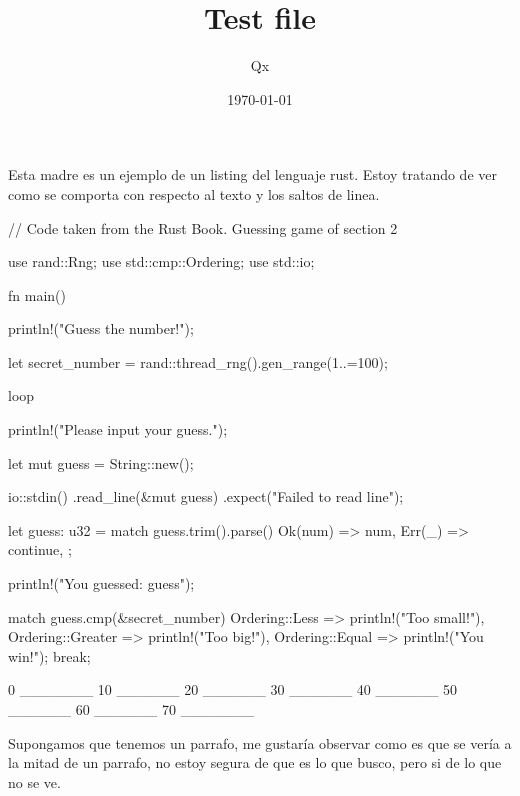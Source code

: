 \documentclass[pagecolor=true, pagesize=a5paper, stretchmode]{qx-files/qx-notes}
\title{Test file}
\author{Qx}
\date{\today}
\begin{document}
  \maketitle

  Esta madre es un ejemplo de un listing del lenguaje rust. Estoy tratando de ver
  como se comporta con respecto al texto y los saltos de linea.


  \begin{codeblock}
    // Code taken from the Rust Book. Guessing game of section 2

    use rand::Rng;
    use std::cmp::Ordering;
    use std::io;

    fn main() {
      println!("Guess the number!");

      let secret_number = rand::thread_rng().gen_range(1..=100);

      loop {
        println!("Please input your guess.");

        let mut guess = String::new();

        io::stdin()
            .read_line(&mut guess)
            .expect("Failed to read line");

        let guess: u32 = match guess.trim().parse() {
          Ok(num) => num,
          Err(_) => continue,
        };

        println!("You guessed: {guess}");

        match guess.cmp(&secret_number) {
          Ordering::Less => println!("Too small!"),
          Ordering::Greater => println!("Too big!"),
          Ordering::Equal => {
            println!("You win!");
            break;
          }
        }
      }
    }
  \end{codeblock}


  \begin{codeblock}
    0 _______ 10 ______ 20 ______ 30 ______ 40 ______ 50 ______ 60 ______ 70 _______
  \end{codeblock}

  Supongamos que tenemos un parrafo, me gustaría observar como es que
   se vería a la mitad de un parrafo, no estoy segura de que es lo que busco, pero si de lo que no se ve.
\end{document}
